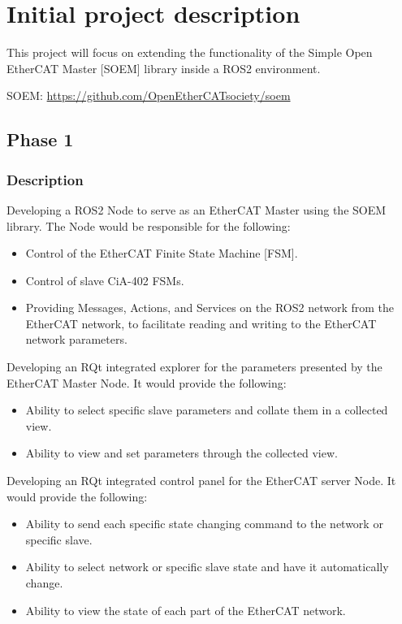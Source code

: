 \section{Initial project description}

This project will focus on extending the functionality of the Simple Open EtherCAT Master [SOEM] library inside a ROS2 environment. 

\noindent
SOEM: \url{https://github.com/OpenEtherCATsociety/soem} 

\subsection{Phase 1}
\subsubsection{Description}

\noindent
Developing a ROS2 Node to serve as an EtherCAT Master using the SOEM library. The Node would be responsible for the following:  

\begin{itemize}[nosep]
	\item Control of the EtherCAT Finite State Machine [FSM].
	\item Control of slave CiA-402 FSMs.
	\item Providing Messages, Actions, and Services on the ROS2 network from the EtherCAT network, to facilitate reading and writing to the EtherCAT network parameters. 
\end{itemize}

\noindent
Developing an RQt integrated explorer for the parameters presented by the EtherCAT Master Node. It would provide the following:

\begin{itemize}[nosep]
	\item Ability to select specific slave parameters and collate them in a collected view.
	\item Ability to view and set parameters through the collected view.
\end{itemize}

\noindent
Developing an RQt integrated control panel for the EtherCAT server Node. It would provide the following:

\begin{itemize}[nosep]
	\item Ability to send each specific state changing command to the network or specific slave.
	\item Ability to select network or specific slave state and have it automatically change.
	\item Ability to view the state of each part of the EtherCAT network.
\end{itemize}


